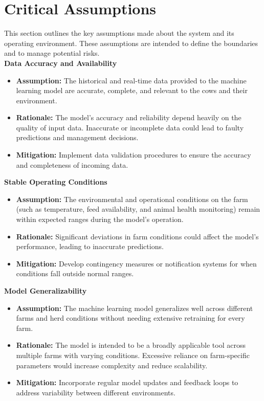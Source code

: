 \documentclass{article}
\begin{document}
\section{Critical Assumptions}

This section outlines the key assumptions made about the system and its 
operating environment. These assumptions are intended to define the boundaries 
and to manage potential risks.\\

\textbf{Data Accuracy and Availability}
\begin{itemize}
    \item \textbf{Assumption:} The historical and real-time data provided to the 
    machine learning model are accurate, complete, and relevant to the cows and 
    their environment.
    \item \textbf{Rationale:} The model's accuracy and reliability depend heavily 
    on the quality of input data. Inaccurate or incomplete data could lead to 
    faulty predictions and management decisions.
    \item \textbf{Mitigation:} Implement data validation procedures to ensure 
    the accuracy and completeness of incoming data.
\end{itemize}

\textbf{Stable Operating Conditions}
\begin{itemize}
    \item \textbf{Assumption:} The environmental and operational conditions on 
    the farm (such as temperature, feed availability, and animal health 
    monitoring) remain within expected ranges during the model's operation.
    \item \textbf{Rationale:} Significant deviations in farm conditions could 
    affect the model's performance, leading to inaccurate predictions.
    \item \textbf{Mitigation:} Develop contingency measures or notification 
    systems for when conditions fall outside normal ranges.
\end{itemize}

\textbf{Model Generalizability}
\begin{itemize}
    \item \textbf{Assumption:} The machine learning model generalizes well 
    across different farms and herd conditions without needing extensive 
    retraining for every farm.
    \item \textbf{Rationale:} The model is intended to be a broadly applicable 
    tool across multiple farms with varying conditions. Excessive reliance on 
    farm-specific parameters would increase complexity and reduce scalability.
    \item \textbf{Mitigation:} Incorporate regular model updates and feedback 
    loops to address variability between different environments.
\end{itemize}
\end{document}
